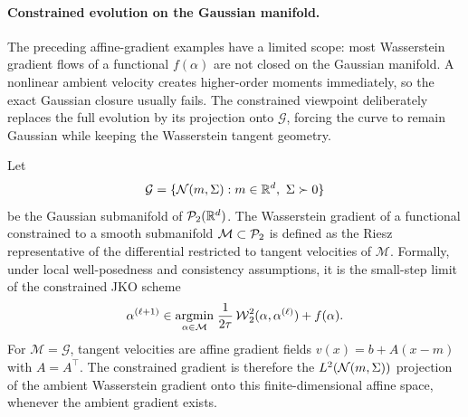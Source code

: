 \paragraph{Constrained evolution on the Gaussian manifold.}

The preceding affine-gradient examples have a limited scope: most Wasserstein gradient flows of a functional \(f(\alpha)\) are not closed on the Gaussian manifold. A nonlinear ambient velocity creates higher-order moments immediately, so the exact Gaussian closure usually fails. The constrained viewpoint deliberately replaces the full evolution by its projection onto \(\mathcal G\), forcing the curve to remain Gaussian while keeping the Wasserstein tangent geometry.

Let
\[
	\mathcal G=\{\mathcal{N}(m,\Sigma):m\in\mathbb{R}^d,\ \Sigma\succ0\}
\]
be the Gaussian submanifold of $\mathcal{P}_2(\mathbb{R}^d)$. The Wasserstein gradient of a functional constrained to a smooth submanifold $\mathcal M\subset\mathcal{P}_2$ is defined as the Riesz representative of the differential restricted to tangent velocities of $\mathcal M$. Formally, under local well-posedness and consistency assumptions, it is the small-step limit of the constrained JKO scheme
\[
	\alpha^{(\ell+1)}\in
	\underset{\alpha\in\mathcal M}{\operatorname{argmin}}\;
	\frac{1}{2\tau}\operatorname{\mathcal{W}}_2^2(\alpha,\alpha^{(\ell)})+f(\alpha).
\]
For $\mathcal M=\mathcal G$, tangent velocities are affine gradient fields $v(x)=b+A(x-m)$ with $A=A^\top$. The constrained gradient is therefore the $L^2(\mathcal{N}(m,\Sigma))$ projection of the ambient Wasserstein gradient onto this finite-dimensional affine space, whenever the ambient gradient exists.

